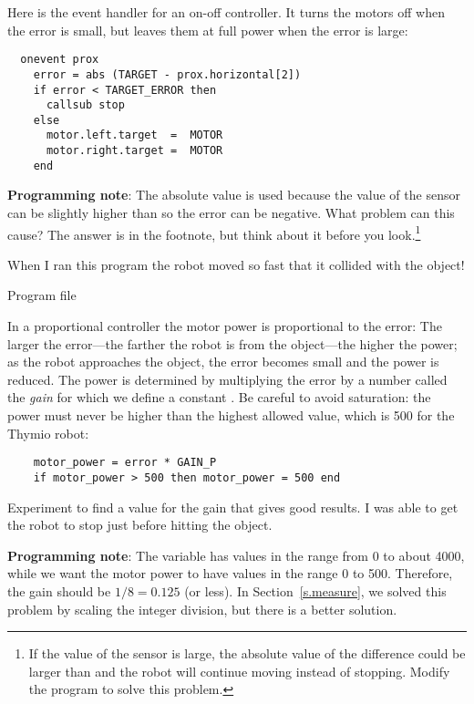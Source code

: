 Here is the event handler for an on-off controller. It turns the motors
off when the error is small, but leaves them at full power when the
error is large:

\begin{verbatim}
  onevent prox
    error = abs (TARGET - prox.horizontal[2])
    if error < TARGET_ERROR then
      callsub stop
    else
      motor.left.target  =  MOTOR
      motor.right.target =  MOTOR
    end
\end{verbatim}

\textbf{Programming note}: The absolute value is used because the value
of the sensor can be slightly higher than  so the error can be
negative. What problem can this cause? The answer is in the footnote,
but think about it before you look.\footnote{If the value of the sensor
is large, the absolute value of the difference could be larger than
 and the robot will continue moving instead of
stopping. Modify the program to solve this problem.}

When I ran this program the robot moved so fast that it collided with
the object!


{\raggedleft \hfill Program file }

In a proportional controller the motor power is proportional to the
error: The larger the error---the farther the robot is from the
object---the higher the power; as the robot approaches the object,
the error becomes small and the power is reduced. The power is
determined by multiplying the error by a number called the \emph{gain}
for which we define a constant . Be careful to avoid
saturation: the power must never be higher than the highest allowed
value, which is 500 for the Thymio robot:

\begin{verbatim}
    motor_power = error * GAIN_P
    if motor_power > 500 then motor_power = 500 end
\end{verbatim}

Experiment to find a value for the gain that gives good results. I was
able to get the robot to stop just before hitting the object.

\textbf{Programming note}: The variable  has values in the
range from 0 to about 4000, while we want the motor power to have values
in the range 0 to 500. Therefore, the gain should be $1/8 = 0.125$ (or
less). In Section~\ref{s.measure}, we solved this problem by scaling
the integer division, but there is a better solution.

